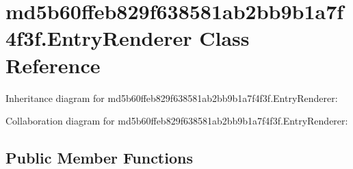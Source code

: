 \hypertarget{classmd5b60ffeb829f638581ab2bb9b1a7f4f3f_1_1_entry_renderer}{}\section{md5b60ffeb829f638581ab2bb9b1a7f4f3f.\+Entry\+Renderer Class Reference}
\label{classmd5b60ffeb829f638581ab2bb9b1a7f4f3f_1_1_entry_renderer}


Inheritance diagram for md5b60ffeb829f638581ab2bb9b1a7f4f3f.\+Entry\+Renderer\+:


Collaboration diagram for md5b60ffeb829f638581ab2bb9b1a7f4f3f.\+Entry\+Renderer\+:
\subsection*{Public Member Functions}
